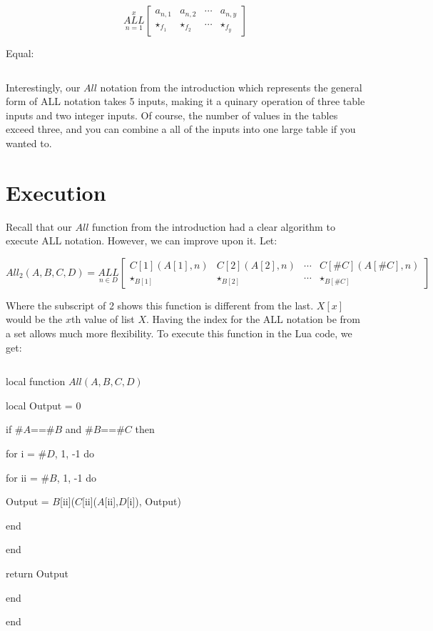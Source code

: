 \documentclass{article}
\begin{document}
$$\underset{n=1}{\overset{x}{ALL}} \begin{bmatrix}
a_{n,1} & a_{n,2} & \cdots & a_{n,y} \\
\star_{f_1} & \star_{f_2} & \cdots & \star_{f_y}
\end{bmatrix}$$

Equal:

$$$$

Interestingly, our $All$ notation from the introduction which represents the general form of ALL notation takes 5 inputs, making it a quinary operation of three table inputs and two integer inputs. Of course, the number of values in the tables exceed three, and you can combine a all of the inputs into one large table if you wanted to.

\section{Execution}

Recall that our $All$ function from the introduction had a clear algorithm to execute ALL notation. However, we can improve upon it. Let:

$$All_2(A, B, C, D)=\underset{n \in D}{ALL} \begin{bmatrix}
C[1](A[1],n) & C[2](A[2],n) & \cdots & C[\#C](A[\#C],n) \\
\star_{B[1]}& \star_{B[2]} & \cdots & \star_{B[\#C]}
\end{bmatrix}$$

Where the subscript of 2 shows this function is different from the last. $X[x]$ would be the $x$th value of list $X$. Having the index for the ALL notation be from a set allows much more flexibility. To execute this function in the Lua code, we get:

$${}$$

local function $All(A, B, C, D)$

local Output = 0

if $\#A$==$\#B$ and $\#B$==$\#C$ then

for i = $\#D$, 1, -1 do

for ii = $\#B$, 1, -1 do

Output = $B$[ii]($C$[ii]($A$[ii],$D$[i]), Output)

end

end

return Output

end

end

$${}$$
\end{document}
